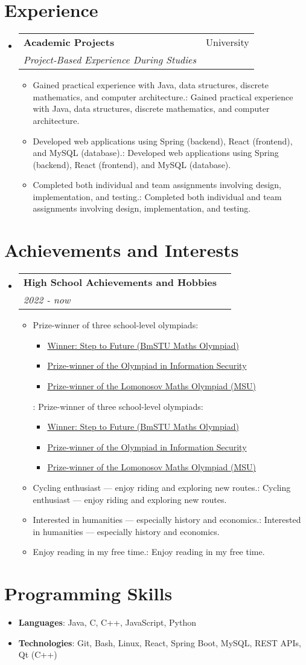 \documentclass[letterpaper,11pt]{article}
\makeatletter
\def \ifempty#1{\def\temp{#1} \ifx\temp\empty }
\newcommand{\resumeItem}[2]{
  \item\small{
    \ifempty{#1}#2\else\textbf{#1}{: #2 \vspace{-2pt}}\fi
  }
}
\newcommand{\resumeSubheading}[4]{
  \vspace{-1pt}\item
    \begin{tabular*}{0.97\textwidth}{l@{\extracolsep{\fill}}r}
      \textbf{#1} & #2 \\
      \textit{\small#3} & \textit{\small #4} \\
    \end{tabular*}\vspace{-5pt}
}
\newcommand{\resumeSubHeadingListStart}{\begin{itemize}[leftmargin=*]}
\newcommand{\resumeSubHeadingListEnd}{\end{itemize}}
\newcommand{\resumeItemListStart}{\begin{itemize}}
\newcommand{\resumeItemListEnd}{\end{itemize}\vspace{-5pt}}
\makeatother
\begin{document}
\section{Experience}
  \resumeSubHeadingListStart
    \resumeSubheading
      {Academic Projects}{University}
      {Project-Based Experience During Studies}{}
    \resumeItemListStart
      \resumeItem{}{Gained practical experience with Java, data structures, discrete mathematics, and computer architecture.}
      \resumeItem{}{Developed web applications using Spring (backend), React (frontend), and MySQL (database).}
      \resumeItem{}{Completed both individual and team assignments involving design, implementation, and testing.}
    \resumeItemListEnd
  \resumeSubHeadingListEnd


\section{Achievements and Interests}
  \resumeSubHeadingListStart
    \resumeSubheading
      {High School Achievements and Hobbies}{} 
      {2022 - now}{}
      \resumeItemListStart
        \resumeItem{}
          {Prize-winner of three school-level olympiads:
            \begin{itemize}
              \item \href{https://olymp.bmstu.ru/ru/winners/list/2022/11/maths}{Winner: Step to Future (BmSTU Maths Olympiad)}
              \item \href{https://v-olymp.ru/olmp_it/news/}{Prize-winner of the Olympiad in Information Security}
              \item \href{https://olymp.msu.ru/rus/event/6974/page/2733}{Prize-winner of the Lomonosov Maths Olympiad (MSU)}
            \end{itemize}
          }
        \resumeItem{}
          {Cycling enthusiast — enjoy riding and exploring new routes.}
        \resumeItem{}
          {Interested in humanities — especially history and economics.}
        \resumeItem{}
          {Enjoy reading in my free time.}
      \resumeItemListEnd
  \resumeSubHeadingListEnd



\section{Programming Skills}
 \resumeSubHeadingListStart
   \item{
     \textbf{Languages}{: Java, C, C++, JavaScript, Python }
   }
   \item{
     \textbf{Technologies}{: Git, Bash, Linux, React, Spring Boot, MySQL, REST APIs, Qt (C++) }
   }
 \resumeSubHeadingListEnd



\end{document}
